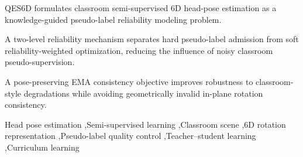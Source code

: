 \documentclass[preprint,12pt]{elsarticle}
\begin{document}
\begin{frontmatter}
\begin{abstract}
We evaluate QES6D on BIWI, AFLW2000, and unlabeled classroom images using standard angular-error metrics, augmentation-consistency diagnostics, pseudo-label admission analysis, component ablation, and reference-free classroom temporal-stability diagnostics. On AFLW2000 and BIWI, QES6D obtains competitive or improved average angular errors under the unified evaluation protocol. For classroom images without dense pose annotations, we deliberately avoid claiming ground-truth-based classroom accuracy; instead, we report qualitative visualization and reference-free diagnostics that characterize temporal stability, localization sensitivity, and remaining failure cases.

\end{abstract}

\begin{highlights}

\item QES6D formulates classroom semi-supervised 6D head-pose estimation as a knowledge-guided pseudo-label reliability modeling problem.

\item A two-level reliability mechanism separates hard pseudo-label admission from soft reliability-weighted optimization, reducing the influence of noisy classroom pseudo-supervision.

\item A pose-preserving EMA consistency objective improves robustness to classroom-style degradations while avoiding geometrically invalid in-plane rotation consistency.

\end{highlights}

\begin{keyword}

Head pose estimation \sep Semi-supervised learning \sep Classroom scene \sep 6D rotation representation \sep Pseudo-label quality control \sep Teacher--student learning \sep Curriculum learning

\end{keyword}

\end{frontmatter}
\end{document}
